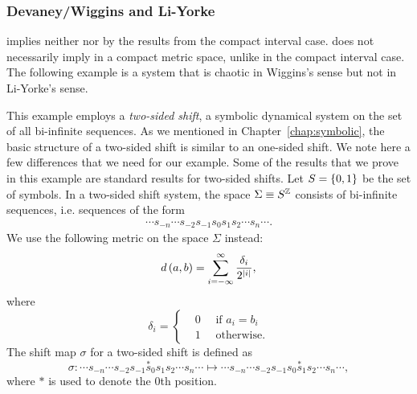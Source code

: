 \documentclass[10pt,twoside,draft]{book}
\begin{document}
\subsubsection*{Devaney/Wiggins and Li-Yorke}
\liy implies neither \dev nor \wig by the results from the compact interval case.
\wig does not necessarily imply \liy in a compact metric space, unlike in the compact interval case.
The following example is a system that is chaotic in Wiggins's sense but not in Li-Yorke's sense.
\begin{example}
  \citep{blanchard}
  This example employs a \textit{two-sided shift}, a symbolic dynamical system on the set of all bi-infinite sequences.
  As we mentioned in Chapter~\ref{chap:symbolic}, the basic structure of a two-sided shift is similar to an one-sided shift.
  We note here a few differences that we need for our example.
  Some of the results that we prove in this example are standard results for two-sided shifts.
  Let $S = \left \{ 0,1 \right \}$ be the set of symbols.
  In a two-sided shift system, the space $\Sigma \equiv S^{\mathbb{Z}}$ consists of bi-infinite sequences, i.e. sequences of the form
  \begin{align*}
    \cdots s_{-n} \cdots s_{-2} s_{-1} s_0 s_1 s_2 \cdots s_n \cdots.
  \end{align*}
  We use the following metric on the space $\Sigma$ instead:
  \begin{equation*}
    d\left( a,b \right) = \sum\limits_{i = -\infty}^{\infty} \frac{\delta_i}{2^{\left | i \right |}},
  \end{equation*}
  where
  \begin{equation*}
    \delta_i = 
    \begin{cases}
      &0 \quad \mbox{ if } a_i = b_i  \\
      &1 \quad \mbox{ otherwise.}
    \end{cases}
  \end{equation*}
  The shift map $\sigma$ for a two-sided shift is defined as
  \begin{equation*}
    \sigma: 
    \cdots s_{-n} \cdots s_{-2} s_{-1} \overset{*}s_0 s_1 s_2 \cdots s_n \cdots
    \mapsto
    \cdots s_{-n} \cdots s_{-2} s_{-1} s_0 \overset{*}s_1 s_2 \cdots s_n \cdots,
  \end{equation*}
  where $*$ is used to denote the 0th position.


\end{example}
\end{document}
